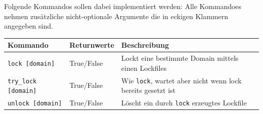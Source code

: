 Folgende Kommandos sollen dabei implementiert werden:
Alle Kommandoes nehmen zusätzliche nicht-optionale Argumente die in
eckigen Klammern angegeben sind.
\begin{table}[h]
  \centering
  \begin{tabular}{|l|l|p{6cm}|}
    \hline
    \textbf{Kommando} & \textbf{Returnwerte} & \textbf{Beschreibung} \\
    \hline
    \texttt{lock [domain]} 
    & True/False 
    & Lockt eine bestimmte Domain mittels einen Lockfiles 
    \\
    \hline
    \texttt{try\_lock [domain]} 
    & True/False 
    & Wie \texttt{lock}, wartet aber nicht wenn lock bereits gesetzt ist 
    \\
    \hline
    \texttt{unlock [domain]} 
    & True/False 
    & Löscht ein durch \texttt{lock} erzeugtes Lockfile 
    \\
    \hline
  \end{tabular}
\end{table}
